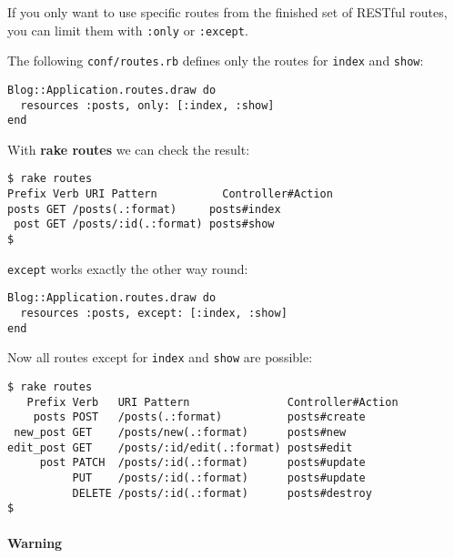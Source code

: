 \documentclass[a4paper]{book}
\begin{document}
If you only want to use specific routes from the finished set of RESTful routes, you can limit them with \texttt{:only} or \texttt{:except}.

The following \texttt{conf/routes.rb} defines only the routes for \texttt{index} and \texttt{show}:

\begin{shaded}\begin{verbatim}
Blog::Application.routes.draw do
  resources :posts, only: [:index, :show]
end
\end{verbatim}\end{shaded}

With \textbf{rake routes} we can check the result:

\begin{shaded}\begin{verbatim}
$ rake routes
Prefix Verb URI Pattern          Controller#Action
posts GET /posts(.:format)     posts#index
 post GET /posts/:id(.:format) posts#show
$
\end{verbatim}\end{shaded}

\texttt{except} works exactly the other way round:

\begin{shaded}\begin{verbatim}
Blog::Application.routes.draw do
  resources :posts, except: [:index, :show]
end
\end{verbatim}\end{shaded}

Now all routes except for \texttt{index} and \texttt{show} are possible:

\begin{shaded}\begin{verbatim}
$ rake routes
   Prefix Verb   URI Pattern               Controller#Action
    posts POST   /posts(.:format)          posts#create
 new_post GET    /posts/new(.:format)      posts#new
edit_post GET    /posts/:id/edit(.:format) posts#edit
     post PATCH  /posts/:id(.:format)      posts#update
          PUT    /posts/:id(.:format)      posts#update
          DELETE /posts/:id(.:format)      posts#destroy
$
\end{verbatim}\end{shaded}

\paragraph{Warning}\label{warning-11}
\end{document}
